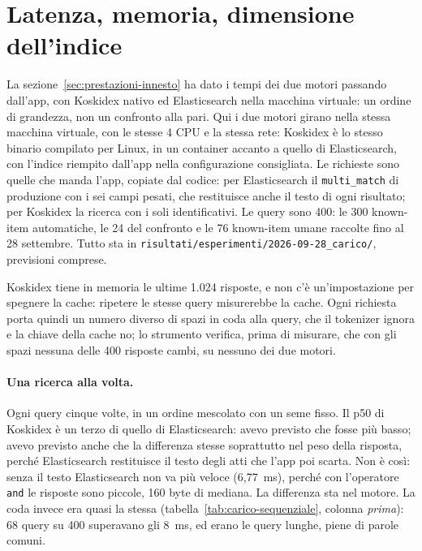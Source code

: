 \section{Latenza, memoria, dimensione dell'indice}\label{sec:latenza}

La sezione~\ref{sec:prestazioni-innesto} ha dato i tempi dei due motori
passando dall'app, con Koskidex nativo ed Elasticsearch nella macchina
virtuale: un ordine di grandezza, non un confronto alla pari. Qui i due motori
girano nella stessa macchina virtuale, con le stesse 4 CPU e la stessa rete:
Koskidex è lo stesso binario compilato per Linux, in un container accanto a
quello di Elasticsearch, con l'indice riempito dall'app nella configurazione
consigliata. Le richieste sono quelle che manda l'app, copiate dal codice: per
Elasticsearch il \texttt{multi\_match} di produzione con i sei campi pesati,
che restituisce anche il testo di ogni risultato; per Koskidex la ricerca con
i soli identificativi. Le query sono 400: le 300 known-item automatiche, le 24
del confronto e le 76 known-item umane raccolte fino al 28 settembre. Tutto
sta in \texttt{risultati/esperimenti/2026-09-28\_carico/}, previsioni
comprese.

Koskidex tiene in memoria le ultime 1.024 risposte, e non c'è un'impostazione
per spegnere la cache: ripetere le stesse query misurerebbe la cache. Ogni
richiesta porta quindi un numero diverso di spazi in coda alla query, che il
tokenizer ignora e la chiave della cache no; lo strumento verifica, prima di
misurare, che con gli spazi nessuna delle 400 risposte cambi, su nessuno dei
due motori.

\paragraph{Una ricerca alla volta.} Ogni query cinque volte, in un ordine
mescolato con un seme fisso. Il p50 di Koskidex è un terzo di quello di
Elasticsearch: avevo previsto che fosse più basso; avevo previsto anche che la differenza
stesse soprattutto nel peso della risposta, perché Elasticsearch restituisce il
testo degli atti che l'app poi scarta. Non è così: senza il testo Elasticsearch
non va più veloce (6,77~ms), perché con l'operatore \texttt{and} le risposte
sono piccole, 160 byte di mediana. La differenza sta nel motore. La coda invece
era quasi la stessa (tabella~\ref{tab:carico-sequenziale}, colonna
\emph{prima}): 68 query su 400 superavano gli 8~ms, ed erano le query lunghe,
piene di parole comuni.

